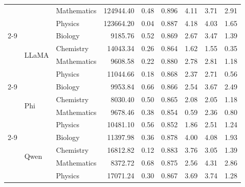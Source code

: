 ﻿\documentclass[a4paper,conference,10pt]{IEEEtran}
\begin{document}
\begin{table}[!t]
\begin{tabular}{|c|l|l|r|r|r|r|r|r|}
  &                                   & Mathematics &124944.40         & 0.48          & 0.896 & 4.11          & 3.71 & 2.91 \\
  &                                   & Physics     &123664.20         & 0.04          & 0.887 & 4.18          & 4.03 & 1.65 \\ \cline{2-9}
  & \multirow{4}{*}{LLaMA}           & Biology     &  9185.76         & 0.52          & 0.869 & 2.67          & 3.47 & 1.39 \\
  &                                   & Chemistry   & 14043.34         & 0.26          & 0.864 & 1.62          & 1.55 & 0.35 \\
  &                                   & Mathematics &  9608.58         & 0.22          & 0.880 & 2.78          & 2.81 & 1.18 \\
  &                                   & Physics     & 11044.66         & 0.18          & 0.868 & 2.37          & 2.71 & 0.56 \\ \cline{2-9}
  & \multirow{4}{*}{Phi}             & Biology     &  9953.84         & 0.66          & 0.866 & 2.54          & 3.67 & 2.49 \\
  &                                   & Chemistry   &  8030.40         & 0.50          & 0.865 & 2.08          & 2.05 & 1.18 \\
  &                                   & Mathematics &  9678.46         & 0.38          & 0.854 & 0.59          & 2.36 & 0.80 \\
  &                                   & Physics     & 10481.10         & 0.56          & 0.852 & 1.86          & 2.51 & 1.24 \\ \cline{2-9}
  & \multirow{4}{*}{Qwen}            & Biology     & 11397.98         & 0.36          & 0.878 & 4.00          & 4.08 & 1.93 \\
  &                                   & Chemistry   & 16812.82         & 0.12          & 0.883 & 3.76          & 3.05 & 1.39 \\
  &                                   & Mathematics &  8372.72         & 0.68 & 0.875 & 2.56          & 4.31 & 2.86 \\
  &                                   & Physics     & 17071.24         & 0.30          & 0.867 & 3.69          & 3.74 & 1.28 \\
\hline
\end{tabular}
\normalsize
\end{table}
\end{document}
